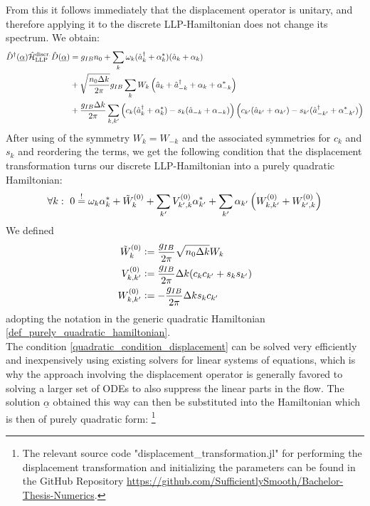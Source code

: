From this it follows immediately that the displacement operator is unitary, and therefore applying it to the discrete LLP-Hamiltonian does not change its spectrum.
We obtain:
\begin{align}
\hat D^\dagger(\underline \alpha)\hat{\mathcal{H}}_{\mathrm{LLP}}^{\mathrm{discr.}}\hat D(\underline\alpha) &=g_{IB}n_0+\sum\limits_k \omega_{ k}(\hat a^\dagger_{ k}+\alpha_k^*)(\hat a_{ k}+\alpha_k)\nonumber\\
&+\sqrt{\frac{n_0\Delta k}{2\pi}}g_{IB}\sum\limits_k W_k \left(\hat a_{ k}+\hat a^\dagger_{- k}+\alpha_k+\alpha_{-k}^*\right) \nonumber\\ 
&+ \frac{g_{IB}\Delta k}{2\pi}\sum\limits_{k,k^\prime} \left(c_k(\hat a^\dagger_k+\alpha_k^*)-s_k(\hat a_{-k}+\alpha_{-k})\right)\left(c_{k^\prime}(\hat a_{k^\prime}+\alpha_{k^\prime})-s_{k^\prime}(\hat a^\dagger_{-k^\prime}+\alpha_{-k^\prime}^*)\right)
\end{align}
After using of the symmetry $W_k=W_{-k}$ and the associated symmetries for $c_k$ and $s_k$ and reordering the terms, we get the following condition that the displacement transformation turns our discrete LLP-Hamiltonian into a purely quadratic Hamiltonian:
\begin{equation}\label{quadratic_condition_displacement}
\forall k:\ 0\overset{!}{=}\omega_k\alpha_k^*+\tilde W_k^{(0)}+\sum\limits_{k^\prime}V_{k^\prime,k}^{(0)}\alpha_{k^\prime}^*+\sum\limits_{k^\prime}\alpha_{k^\prime}\left(W_{k,k^\prime}^{(0)}+W_{k^\prime,k}^{(0)}\right)
\end{equation}
We defined
\begin{subequations}
\begin{align}
\tilde W_k^{(0)}&\vcentcolon= \frac{g_{IB}}{2\pi}\sqrt{n_0\Delta k} W_k\\
V_{k,k^\prime}^{(0)}&\vcentcolon=\frac{g_{IB}}{2\pi}\Delta k(c_k c_{k^\prime}+s_{k}s_{k^\prime})\\
W_{k,k^\prime}^{(0)}&\vcentcolon= -\frac{g_{IB}}{2\pi}\Delta k s_k c_{k^\prime}
\end{align}
\end{subequations}
adopting the notation in the generic quadratic Hamiltonian \ref{def_purely_quadratic_hamiltonian}.\\
The condition \ref{quadratic_condition_displacement} can be solved very efficiently and inexpensively using existing solvers for linear systems of equations, which is why the approach involving the displacement operator is generally favored to solving a larger set of ODEs to also suppress the linear parts in the flow. The solution $\underline\alpha$ obtained this way can then be substituted into the Hamiltonian which is then of purely quadratic form: \footnote{The relevant source code "displacement\_transformation.jl" for performing the displacement transformation and initializing the parameters can be found in the GitHub Repository \url{https://github.com/SufficientlySmooth/Bachelor-Thesis-Numerics}.}
